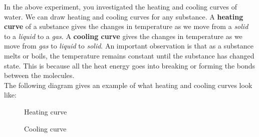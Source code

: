  \label{m38736*eip-25}In the above experiment, you investigated the heating and cooling curves of water. We can draw heating and cooling curves for any substance. A \textbf{heating curve} of a substance gives the changes in temperature as we move from a \textsl{solid} to a \textsl{liquid} to a \textsl{gas}. A \textbf{cooling curve} gives the changes in temperature as we move from \textsl{gas} to \textsl{liquid} to \textsl{solid}. An important observation is that as a substance melts or boils, the temperature remains constant until the substance has changed state. This is because all the heat energy goes into breaking or forming the bonds between the molecules. \\
The following diagram gives an example of what heating and cooling curves look like: \\
\begin{minipage}{0.5\textwidth}
\begin{figure}[H]
 \begin{center}
\end{center}
\caption{Heating curve}
\end{figure}
\end{minipage}
\begin{minipage}{0.5\textwidth}
\begin{figure}[H]
\begin{center}
 \end{center}
\caption{Cooling curve}
\end{figure}
\end{minipage}


